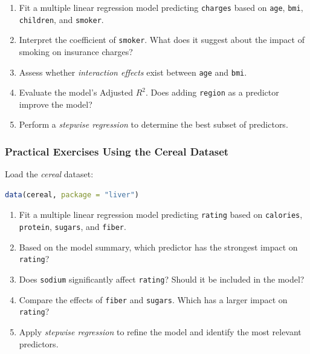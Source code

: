 \documentclass[
  11pt,
]{book}
\newcommand{\passthrough}[1]{#1}
\providecommand{\tightlist}{%
  \setlength{\itemsep}{0pt}\setlength{\parskip}{0pt}}
\theoremstyle{definition}
\theoremstyle{definition}
\theoremstyle{definition}
\theoremstyle{definition}
\theoremstyle{remark}
\begin{document}
\begin{enumerate}
\def\labelenumi{\arabic{enumi}.}
\setcounter{enumi}{14}
\tightlist
\item
  Fit a multiple linear regression model predicting \passthrough{\lstinline!charges!} based on \passthrough{\lstinline!age!}, \passthrough{\lstinline!bmi!}, \passthrough{\lstinline!children!}, and \passthrough{\lstinline!smoker!}.\\
\item
  Interpret the coefficient of \passthrough{\lstinline!smoker!}. What does it suggest about the impact of smoking on insurance charges?\\
\item
  Assess whether \emph{interaction effects} exist between \passthrough{\lstinline!age!} and \passthrough{\lstinline!bmi!}.\\
\item
  Evaluate the model's Adjusted \(R^2\). Does adding \passthrough{\lstinline!region!} as a predictor improve the model?\\
\item
  Perform a \emph{stepwise regression} to determine the best subset of predictors.
\end{enumerate}

\subsubsection*{Practical Exercises Using the Cereal Dataset}\label{practical-exercises-using-the-cereal-dataset}


Load the \emph{cereal} dataset:

\begin{lstlisting}[language=R]
data(cereal, package = "liver")
\end{lstlisting}

\begin{enumerate}
\def\labelenumi{\arabic{enumi}.}
\setcounter{enumi}{19}
\tightlist
\item
  Fit a multiple linear regression model predicting \passthrough{\lstinline!rating!} based on \passthrough{\lstinline!calories!}, \passthrough{\lstinline!protein!}, \passthrough{\lstinline!sugars!}, and \passthrough{\lstinline!fiber!}.\\
\item
  Based on the model summary, which predictor has the strongest impact on \passthrough{\lstinline!rating!}?\\
\item
  Does \passthrough{\lstinline!sodium!} significantly affect \passthrough{\lstinline!rating!}? Should it be included in the model?\\
\item
  Compare the effects of \passthrough{\lstinline!fiber!} and \passthrough{\lstinline!sugars!}. Which has a larger impact on \passthrough{\lstinline!rating!}?\\
\item
  Apply \emph{stepwise regression} to refine the model and identify the most relevant predictors.
\end{enumerate}
\end{document}
